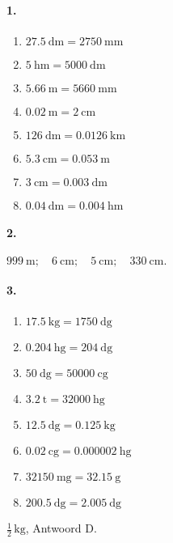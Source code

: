 \documentclass[a4paper,12pt]{article}
\begin{document}
\paragraph{1.}
\begin{multicols}{2}
\begin{enumerate}
  \item \(\SI{27.5}{\deci\metre}=\SI{2750}{\milli\metre}\)
  \item \(\SI{5}{\hecto\metre}=\SI{5000}{\deci\metre}\)
  \item \(\SI{5.66}{\metre}=\SI{5660}{\milli\metre}\)
  \item \(\SI{0.02}{\metre}=\SI{2}{\centi\metre}\)
  \item \(\SI{126}{\deci\metre}=\SI{0.0126}{\kilo\metre}\)
  \item \(\SI{5.3}{\centi\metre}=\SI{0.053}{\metre}\)
  \item \(\SI{3}{\centi\metre}=\SI{0.003}{\deca\metre}\)
  \item \(\SI{0.04}{\deca\metre}=\SI{0.004}{\hecto\metre}\)
\end{enumerate}
\end{multicols}
\paragraph{2.} \(\SI{999}{\metre};\quad \SI{6}{\centi\metre};\quad \SI{5}{\centi\metre};\quad \SI{330}{\centi\metre}.\)

\paragraph{3.}
\begin{multicols}{2}
\begin{enumerate}
  \item \(\SI{17.5}{\kilo\gram}=\SI{1750}{\deca\gram}\)
  \item \(\SI{0.204}{\hecto\gram}=\SI{204}{\deci\gram}\)
  \item \(\SI{50}{\deca\gram}=\SI{50000}{\centi\gram}\)
  \item \(\SI{3.2}{\tonne}=\SI{32000}{\hecto\gram}\)
  \item \(\SI{12.5}{\deca\gram}=\SI{0.125}{\kilo\gram}\)
  \item \(\SI{0.02}{\centi\gram}=\SI{0.000002}{\hecto\gram}\)
  \item \(\SI{32150}{\milli\gram}=\SI{32.15}{\gram}\)
  \item \(\SI{200.5}{\deci\gram}=\SI{2.005}{\deca\gram}\)
\end{enumerate}
\end{multicols}
\(\tfrac{1}{2}\,\si{\kilo\gram}\), Antwoord D.
\end{document}
